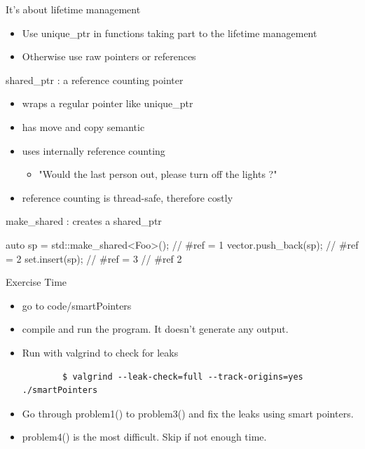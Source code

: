 \begin{frame}[fragile]
  \begin{block}{It's about lifetime management}
    \begin{itemize}
    \item Use unique\_ptr in functions taking part to the lifetime management
    \item Otherwise use raw pointers or references
    \end{itemize}
  \end{block}
\end{frame}

\begin{frame}[fragile]
  \begin{block}{shared\_ptr : a reference counting pointer}
    \begin{itemize}
    \item wraps a regular pointer like unique\_ptr
    \item has move and copy semantic
    \item uses internally reference counting
      \begin{itemize}
      \item "Would the last person out, please turn off the lights ?"
      \end{itemize}
    \item reference counting is thread-safe, therefore costly
    \end{itemize}
  \end{block}
  \begin{block}{make\_shared : creates a shared\_ptr}
    \begin{cppcode*}{}
      {
        auto sp = std::make_shared<Foo>(); // #ref = 1
        vector.push_back(sp);              // #ref = 2
        set.insert(sp);                    // #ref = 3
      } // #ref 2
    \end{cppcode*}
  \end{block}
\end{frame}

\begin{frame}[fragile]
  \begin{alertblock}{Exercise Time}
    \begin{itemize}
    \item go to code/smartPointers
    \item compile and run the program. It doesn't generate any output.
    \item Run with valgrind to check for leaks
      { \scriptsize
      \begin{verbatim}
        $ valgrind --leak-check=full --track-origins=yes ./smartPointers
      \end{verbatim}
      }
    \item Go through {\ttfamily problem1()} to {\ttfamily problem3()} and fix the leaks using smart pointers.
    \item {\ttfamily problem4()} is the most difficult. Skip if not enough time.
    \end{itemize}
  \end{alertblock}
\end{frame}
